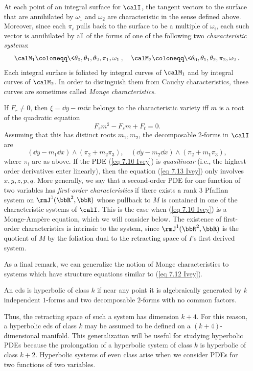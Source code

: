 At each point of an integral surface for $\calI$, the tangent vectors to the surface that are annihilated by $\omega_1$ and $\omega_2$ are characteristic in the sense defined above. Moreover, since each $\pi_i$ pulls back to the surface to be a multiple of $\omega_i$, each such vector is annihilated by all of the forms of one of the following two \emph{characteristic systems}:
\[\calM_1\coloneqq \<\theta_0,\theta_1,\theta_2,\pi_1,\omega_1\>,\quad \calM_2\coloneqq \<\theta_0,\theta_1,\theta_2,\pi_2,\omega_2\>.\]
Each integral surface is foliated by integral curves of $\calM_1$ and by integral curves of $\calM_2$. In order to distinguish them from Cauchy characteristics, these curves are sometimes called \emph{Monge characteristics}.

\begin{rem}
    If $F_r\neq 0$, then $\xi=\dd y-m\dd x$ belongs to the characteristic variety iff $m$ is a root of the quadratic equation 
    \[F_rm^2-F_sm+F_t=0.\label{eq 7.13 Ivey}\]
    Assuming that this has distinct roots $m_1,m_2$, the decomposable $2$-forms in $\calI$ are 
    \[(\dd y-m_1\dd x)\wedge (\pi_2+m_2\pi_3),\quad (\dd y-m_2\dd x)\wedge (\pi_2+m_1\pi_3),\]
    where $\pi_i$ are as above.
    If the PDE (\ref{eq 7.10 Ivey}) is \emph{quasilinear} (i.e., the highest-order derivatives enter linearly), then the equation (\ref{eq 7.13 Ivey}) only involves $x,y,z,p,q$. More generally, we say that a second-order PDE for one function of two variables has \emph{first-order characteristics} if there exists a rank $3$ Pfaffian system on $\rmJ^1(\bbR^2,\bbR)$ whose pullback to $M$ is contained in one of the characteristic systems of $\calI$. This is the case when (\ref{eq 7.10 Ivey}) is a Monge-Amp\`ere equation, which we will consider below. The existence of first-order characteristics is intrinsic to the system, since $\rmJ^1(\bbR^2,\bbR)$ is the quotient of $M$ by the foliation dual to the retracting space of $I$'s first derived system.
\end{rem}
As a final remark, we can generalize the notion of Monge characteristics to systems which have structure equations similar to (\ref{eq 7.12 Ivey}).

\begin{defn}
    An \gls{eds} is hyperbolic of class $k$ if near any point it is algebraically generated by $k$ independent $1$-forms and two decomposable $2$-forms with no common factors.
\end{defn}

Thus, the retracting space of such a system has dimension $k+4$. For this reason, a hyperbolic \gls{eds} of class $k$ may be assumed to be defined on a $(k+4)$-dimensional manifold. This generalization will be useful for studying hyperbolic PDEs because the prolongation of a hyperbolic system of class $k$ is hyperbolic of class $k+2$. Hyperbolic systems of even class arise when we consider PDEs for two functions of two variables.









